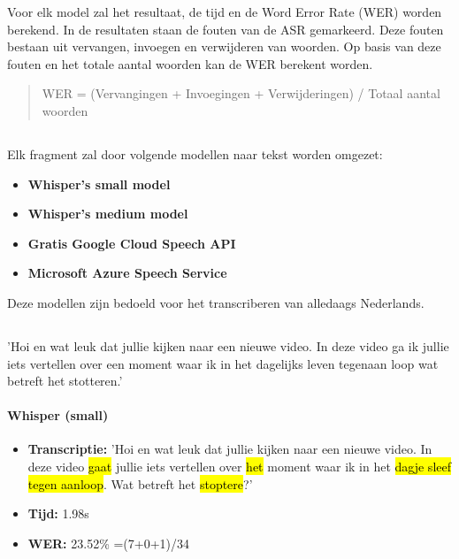 Voor elk model zal het resultaat, de tijd en de Word Error Rate (WER) worden berekend. In de resultaten staan de fouten van de ASR gemarkeerd. Deze fouten bestaan uit vervangen, invoegen en verwijderen van woorden. Op basis van deze fouten en het totale aantal woorden kan de WER berekent worden.

\begin{quote}
    WER = (Vervangingen + Invoegingen + Verwijderingen) / Totaal aantal woorden
\end{quote}

\subsection{}%
Elk fragment zal door volgende modellen naar tekst worden omgezet:
\begin{itemize}
    \item \textbf{Whisper's small model}
    \item \textbf{Whisper's medium model}
    \item \textbf{Gratis Google Cloud Speech API}
    \item \textbf{Microsoft Azure Speech Service}
\end{itemize}
Deze modellen zijn bedoeld voor het transcriberen van alledaags Nederlands.

\subsection{}%
'Hoi en wat leuk dat jullie kijken naar een nieuwe video. In deze video ga ik jullie iets vertellen over een moment waar ik in het dagelijks leven tegenaan loop wat betreft het stotteren.'

\paragraph{Whisper (small)}
\begin{itemize}
    \item \textbf{Transcriptie:} 'Hoi en wat leuk dat jullie kijken naar een nieuwe video. In deze video \hl{gaat} jullie iets vertellen over \hl{het} moment waar ik in het \hl{dagje sleef} \hl{tegen aanloop}. Wat betreft het \hl{stoptere}?'
    \item \textbf{Tijd:} 1.98s
    \item \textbf{WER:} 23.52\% =(7+0+1)/34
\end{itemize}


